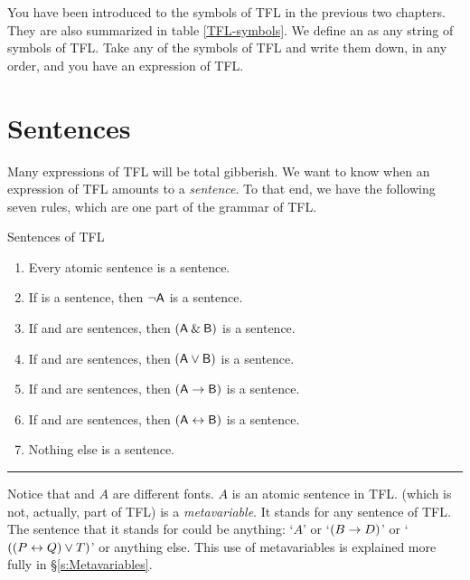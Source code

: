 You have been introduced to the symbols of TFL in the previous two chapters. They are also summarized in table \ref{TFL-symbols}. We define an  as any string of symbols of TFL. Take any of the symbols of TFL and write them down, in any order, and you have an expression of TFL.


\section{Sentences}\label{s:Sentences}
Many expressions of TFL will be total gibberish. We want to know when an expression of TFL amounts to a \emph{sentence}. To that end, we have the following seven rules, which are one part of the grammar of TFL.




\begin{factboxy}{Sentences of TFL}\label{TFLsentences}
	\begin{enumerate}
		\item Every atomic sentence is a sentence.
		\item If  is a sentence, then ${\neg}\mathsf{A}$ is a sentence.
		\item If  and  are sentences, then $(\mathsf{A}\mathbin{\&}\mathsf{B})$ is a sentence.
		\item If  and  are sentences, then $(\mathsf{A}\vee\mathsf{B})$ is a sentence.
		\item If  and  are sentences, then $(\mathsf{A}\rightarrow\mathsf{B})$ is a sentence.
		\item If  and  are sentences, then $(\mathsf{A}\leftrightarrow\mathsf{B})$ is a sentence.
		\item Nothing else is a sentence.
	\end{enumerate}
\hrule
\medskip
\footnotesize{Notice that  and $A$ are different fonts. $A$ is an atomic sentence in TFL.  (which is not, actually, part of TFL) is a \textit{metavariable}. It stands for any sentence of TFL. The sentence that it stands for could be anything: `$A$' or `$(B \rightarrow D)$' or `$((P \leftrightarrow Q) \vee T)$' or anything else. This use of {metavariables} is explained more fully in \S\ref{s:Metavariables}.}
\end{factboxy}

